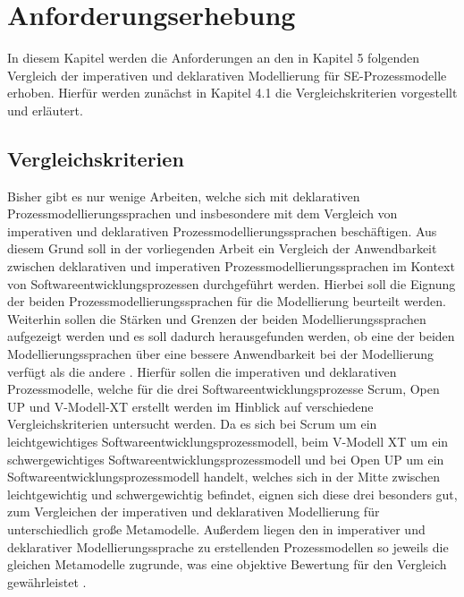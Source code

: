 
\chapter{Anforderungserhebung}\label{sec:chapter5}
In diesem Kapitel werden die Anforderungen an den in Kapitel 5 folgenden Vergleich der imperativen und deklarativen Modellierung für SE-Prozessmodelle erhoben. Hierfür werden zunächst in Kapitel 4.1 die Vergleichskriterien vorgestellt und erläutert. 

\section{Vergleichskriterien}\label{sec:chapter5:Vergleichskriterien}

Bisher gibt es nur wenige Arbeiten, welche sich mit deklarativen Prozessmodellierungssprachen und insbesondere mit dem Vergleich von imperativen und deklarativen Prozessmodellierungssprachen beschäftigen. Aus diesem Grund soll in der vorliegenden Arbeit ein Vergleich der Anwendbarkeit zwischen deklarativen und imperativen Prozessmodellierungssprachen im Kontext von Softwareentwicklungsprozessen durchgeführt werden. Hierbei soll die Eignung der beiden Prozessmodellierungssprachen für die Modellierung beurteilt werden. Weiterhin sollen die Stärken und Grenzen der beiden Modellierungssprachen aufgezeigt werden und es soll dadurch herausgefunden werden, ob eine der beiden Modellierungssprachen über eine bessere Anwendbarkeit bei der Modellierung verfügt als die andere \cite{list2006evaluation}.\newline
Hierfür sollen die imperativen und deklarativen Prozessmodelle, welche für die drei Softwareentwicklungsprozesse Scrum, Open UP und V-Modell-XT erstellt werden im Hinblick auf verschiedene Vergleichskriterien untersucht werden. Da es sich bei Scrum um ein leichtgewichtiges Softwareentwicklungsprozessmodell, beim V-Modell XT um ein schwergewichtiges Softwareentwicklungsprozessmodell und bei Open UP um ein Softwareentwicklungsprozessmodell handelt, welches sich in der Mitte zwischen leichtgewichtig und schwergewichtig befindet, eignen sich diese drei besonders gut, zum Vergleichen der imperativen und deklarativen Modellierung für unterschiedlich große Metamodelle. Außerdem liegen den in imperativer und deklarativer Modellierungssprache zu erstellenden Prozessmodellen so jeweils die gleichen Metamodelle zugrunde, was eine objektive Bewertung für den Vergleich gewährleistet \cite{list2006evaluation}. \newline

